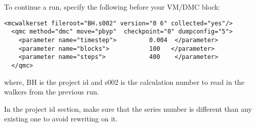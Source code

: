 \begin{itemize}
To continue a run, specify the following before your VM/DMC block:
\begin{lstlisting}[caption=Restart (read wakers from previous run) ]
 <mcwalkerset fileroot="BH.s002" version="0 6" collected="yes"/>
  <qmc method="dmc" move="pbyp"  checkpoint="0" dumpconfig="5">
    <parameter name="timestep">         0.004  </parameter>
    <parameter name="blocks">           100   </parameter>
    <parameter name="steps">            400    </parameter>
  </qmc>
\end{lstlisting}
where, BH is the project id and s002 is the calculation number to read in the walkers from the previous run.

In the project id section, make sure that the series number is different than any existing one to avoid rewriting on it. 

\end{itemize}
